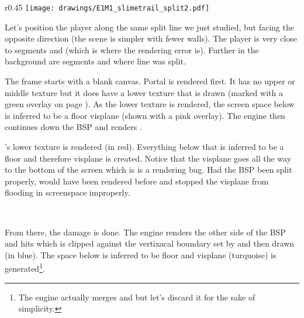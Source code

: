 \begin{minipage}{0.47\textwidth}
\end{minipage}
\hspace{4mm}
\begin{minipage}{0.47\textwidth}
\end{minipage} 
\par
\vspace{1mm}
\par



\par
\begin{wrapfigure}[22]{r}{0.45\textwidth}
\centering
\texttt{[image: drawings/E1M1\_slimetrail\_split2.pdf]}
\end{wrapfigure}
Let's position the player along the same split line we just studied, but facing the opposite direction (the scene is simpler with fewer walls). The player is very close to segments  and  (which is where the rendering error is). Further in the background are segments  and  where line  was split.\\
\par
The frame starts with a blank canvas. Portal  is rendered first. It has no upper or middle texture but it does have a lower texture that is drawn (marked with a green overlay on page \pageref{leak_opposite_explained.png}). As the lower texture is rendered, the screen space below is inferred to be a floor visplane  (shown with a pink overlay). The engine then continues down the BSP and renders .\\
\par

 's lower texture is rendered (in red). Everything below that is inferred to be a floor and therefore visplane  is created. Notice that the visplane goes all the way to the bottom of the screen which is is a rendering bug. Had the BSP been split properly,  would have been rendered before  and stopped the visplane from flooding in screenspace improperly.\\
\par
 

\\
\label{leak_opposite_explained.png}
\par
From there, the damage is done. The engine renders the other side of the BSP and hits  which is clipped against the vertixacal boundary set by  and then drawn (in blue). The space below  is inferred to be floor and visplane  (turquoise) is generated\footnote{The engine actually merges  and  but let's discard it for the sake of simplicity.}.

